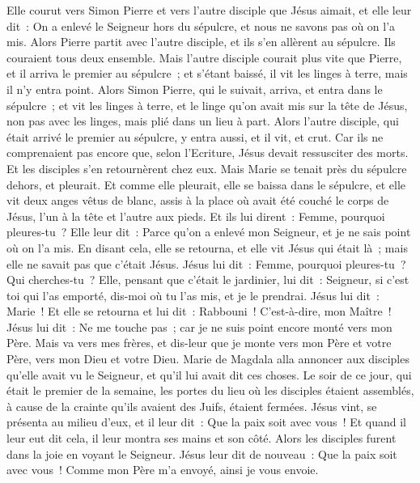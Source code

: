 \begin{multicols}{2}
Elle courut vers Simon Pierre et vers l'autre disciple que Jésus aimait, et elle leur dit~: On a enlevé le Seigneur hors du sépulcre, et nous ne savons pas où on l'a mis.
Alors Pierre partit avec l'autre disciple, et ils s'en allèrent au sépulcre.
Ils couraient tous deux ensemble. Mais l'autre disciple courait plus vite que Pierre, et il arriva le premier au sépulcre~;
et s'étant baissé, il vit les linges à terre, mais il n'y entra point.
Alors Simon Pierre, qui le suivait, arriva, et entra dans le sépulcre~; et vit les linges à terre,
et le linge qu'on avait mis sur la tête de Jésus, non pas avec les linges, mais plié dans un lieu à part.
Alors l'autre disciple, qui était arrivé le premier au sépulcre, y entra aussi, et il vit, et crut.
Car ils ne comprenaient pas encore que, selon l'Ecriture, Jésus devait ressusciter des morts.
Et les disciples s'en retournèrent chez eux.
Mais Marie se tenait près du sépulcre dehors, et pleurait. Et comme elle pleurait, elle se baissa dans le sépulcre,
et elle vit deux anges vêtus de blanc, assis à la place où avait été couché le corps de Jésus, l'un à la tête et l'autre aux pieds.
Et ils lui dirent~: Femme, pourquoi pleures-tu~? Elle leur dit~: Parce qu'on a enlevé mon Seigneur, et je ne sais point où on l'a mis.
En disant cela, elle se retourna, et elle vit Jésus qui était là~; mais elle ne savait pas que c'était Jésus.
Jésus lui dit~: Femme, pourquoi pleures-tu~? Qui cherches-tu~? Elle, pensant que c'était le jardinier, lui dit~: Seigneur, si c'est toi qui l'as emporté, dis-moi où tu l'as mis, et je le prendrai.
Jésus lui dit~: Marie~! Et elle se retourna et lui dit~: Rabbouni~! C'est-à-dire, mon Maître~!
Jésus lui dit~: Ne me touche pas~; car je ne suis point encore monté vers mon Père. Mais va vers mes frères, et dis-leur que je monte vers mon Père et votre Père, vers mon Dieu et votre Dieu.
Marie de Magdala alla annoncer aux disciples qu'elle avait vu le Seigneur, et qu'il lui avait dit ces choses.
Le soir de ce jour, qui était le premier de la semaine, les portes du lieu où les disciples étaient assemblés, à cause de la crainte qu'ils avaient des Juifs, étaient fermées. Jésus vint, se présenta au milieu d'eux, et il leur dit~: Que la paix soit avec vous~!
Et quand il leur eut dit cela, il leur montra ses mains et son côté. Alors les disciples furent dans la joie en voyant le Seigneur.
Jésus leur dit de nouveau~: Que la paix soit avec vous~! Comme mon Père m'a envoyé, ainsi je vous envoie.

\end{multicols}
